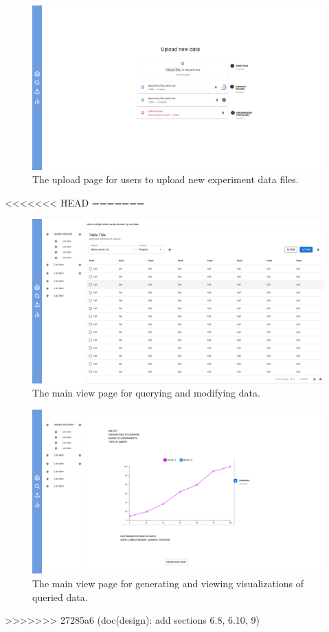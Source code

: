 \documentclass[12pt, titlepage]{article}
\begin{document}
\begin{description}
\begin{description}
\begin{figure}[htbp]
  \centering
  \includegraphics[width=\textwidth]{Figma/upload.pdf}
  \caption{The upload page for users to upload new experiment data files.}
  \label{fig:FigUIUP}
\end{figure}
<<<<<<< HEAD
=======

\begin{figure}[htbp]
  \centering
  \includegraphics[width=\textwidth]{Figma/table.pdf}
  \caption{The main view page for querying and modifying data.}
  \label{fig:FigUITB}
\end{figure}

\begin{figure}[htbp]
  \centering
  \includegraphics[width=\textwidth]{Figma/graphs.pdf}
  \caption{The main view page for generating and viewing visualizations of queried data.}
  \label{fig:FigUIG}
\end{figure}
>>>>>>> 27285a6 (doc(design): add sections 6.8, 6.10, 9)


\end{description}
\end{description}
\end{document}
